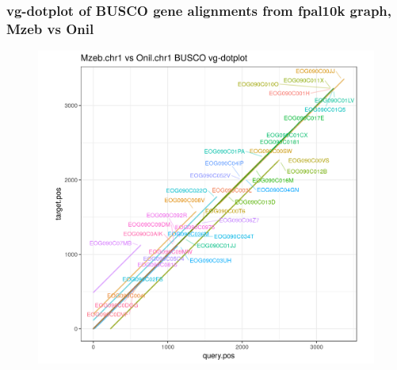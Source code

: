\documentclass[aspectratio=169]{beamer}
\begin{document}
\begin{frame}
  \frametitle{vg-dotplot of BUSCO gene alignments from fpal10k graph, Mzeb vs Onil}
  \begin{figure}
    \includegraphics[scale=0.42,center]{cichlid_chr1_fpal10k_busco_dotplot_Mzeb_Onil.png}
  \end{figure}
\end{frame}
\end{document}
